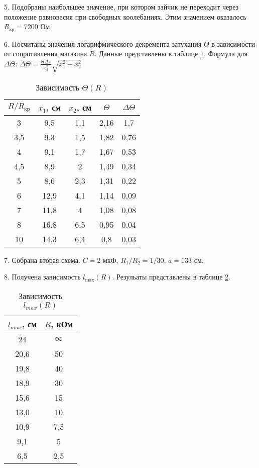5. Подобраны наибольшее значение, при котором зайчик не переходит через положение равновесия при свободных коолебаниях. Этим значением оказалось $R_\text{кр} = 7200$ Ом.

6. Посчитаны значения логарифмического декремента затухания $\Theta$ в зависимости от сопротивления магазина $R$. Данные представлены в таблице \ref{tab:Theta(R)}.
Формула для $\Delta\Theta$: $\Delta\Theta = \frac{\Theta\Delta x}{x^2_2}\sqrt{ x^2_1 + x^2_2}$
\begin{table}[h]
    \centering
    \begin{tabular}{|c|c|c|c|c|}
        \hline
        $R / R_\text{кр}$ & $x_1$, см & $x_2$, см & $\Theta$ & $\Delta\Theta$\\
        \hline
        3 & 9,5 & 1,1 & 2,16 & 1,7\\
        \hline
        3,5 & 9,3 & 1,5 & 1,82 & 0,76\\
        \hline
        4 & 9,1 & 1,7 & 1,67 & 0,53\\
        \hline
        4,5 & 8,9 & 2 & 1,49 & 0,34\\
        \hline
        5 & 8,6 & 2,3 & 1,31 & 0,22\\
        \hline
        6 & 12,9 & 4,1 & 1,14 & 0,09\\
        \hline
        7 & 11,8 & 4 & 1,08 & 0,08\\
        \hline
        8 & 16,8 & 6,5 & 0,95 & 0,04\\
        \hline
        10 & 14,3 & 6,4 & 0,8 & 0,03\\
        \hline
    \end{tabular}
    \caption{Зависимость $\Theta(R)$}
    \label{tab:Theta(R)}
\end{table}

7. Собрана вторая схема. $C = 2$ мкФ, $R_1/R_2 = 1/30$, $a = 133$ см.

8. Получена зависимость $l_\text{max} (R)$. Резульаты представлены в таблице \ref{l(R)}.
\begin{table}[h]
    \centering
    \begin{tabular}{|c|c|}
        \hline
        $l_{max}$, см & $R$, кОм \\
        \hline
        24 & $\infty$ \\
        \hline
        20,6 & 50 \\
        \hline
        19,8 & 40 \\
        \hline
        18,9 & 30 \\
        \hline
        15,6 & 15 \\
        \hline
        13,0 & 10 \\
        \hline
        10,9 & 7,5 \\
        \hline
        9,1 & 5 \\
        \hline
        6,5 & 2,5 \\
        \hline
    \end{tabular}
    \caption{Зависимость $l_{max}(R)$}
    \label{l(R)}
\end{table}

